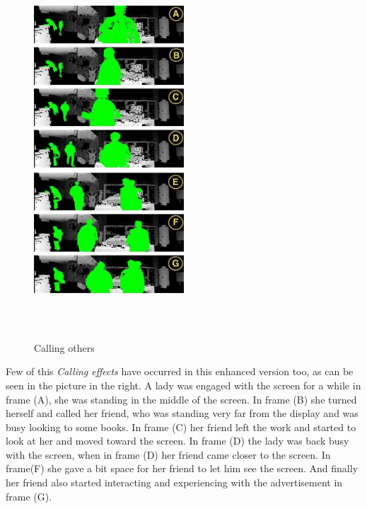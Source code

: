 \begin{figure}
  \vspace{-10pt}
  \begin{center}
    \includegraphics[width=0.50\textwidth,height=140mm]{Figures/9/effects/calling_others}
  \end{center}
  \vspace{-20pt}
  \caption{Calling others}
  \vspace{-20pt}
\end{figure}
Few of this \emph{Calling effects} have occurred in this enhanced version too, as can be seen in the picture in the right. A lady was engaged with the screen for a while in frame (A), she was standing in the middle of the screen. In frame (B) she turned herself and called her friend, who was standing very far from the display and was busy looking to some books. In frame (C) her friend left the work and started to look at her and moved toward the screen. In frame (D) the lady was back busy with the screen, when in frame (D) her friend came closer to the screen. In frame(F) she gave a bit space for her friend to let him see the screen. And finally her friend also started interacting and experiencing with the advertisement in frame (G).  
\break
\break
\break
\break
\break
\break
\break
\break
\break


